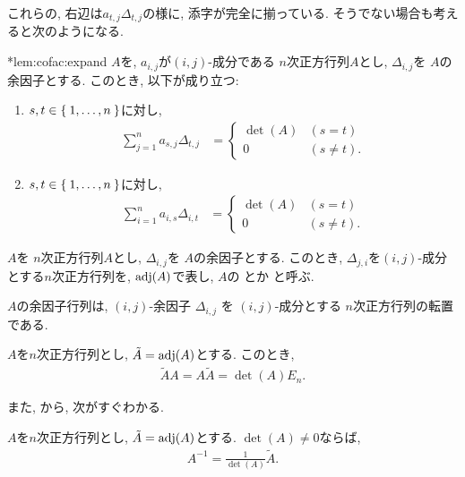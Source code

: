 これらの, 右辺は$a_{t,j}\Delta_{t,j}$の様に, 添字が完全に揃っている.
そうでない場合も考えると次のようになる.
\begin{lemma}
  \provelater**{lem:cofac:expand}
  \label{lem:cofac:expand}
  $A$を,
  $a_{i,j}$が$(i,j)$-成分である
  $n$次正方行列$A$とし,
  $\Delta_{i,j}$を
  $A$の余因子とする.
  このとき, 以下が成り立つ:
  \begin{enumerate}
  \item
  \label{lem:cofac:expand:item:row}    
    $s,t\in\Set{1,\ldots,n}$に対し,
    \begin{align*}
      \sum_{j=1}^{n} a_{s,j}\Delta_{t,j}
      &=
      \begin{cases}
        \det(A) & (s=t)\\
        0 & (s\neq t).
      \end{cases}
    \end{align*}
  \item
    \label{lem:cofac:expand:item:col}    
    $s,t\in\Set{1,\ldots,n}$に対し,
    \begin{align*}
      \sum_{i=1}^{n} a_{i,s}\Delta_{i,t}
      &=
      \begin{cases}
        \det(A) & (s=t)\\
        0 & (s\neq t).
      \end{cases}
    \end{align*}
  \end{enumerate}
\end{lemma}



\begin{definition}
  $A$を
  $n$次正方行列$A$とし,
  $\Delta_{i,j}$を
  $A$の余因子とする.
  このとき,
  $\Delta_{j,i}$を$(i,j)$-成分とする$n$次正方行列を,
  $\operatorname{adj}(A)$で表し,
  $A$の
  とか
  と呼ぶ.
\end{definition}
\begin{remark}
  $A$の余因子行列は,
  $(i,j)$-余因子
  $\Delta_{i,j}$
  を
  $(i,j)$-成分とする
  $n$次正方行列の転置である.
\end{remark}
\begin{prop}
  \label{lem:adj:prod}
  $A$を$n$次正方行列とし,
  $\tilde A = \operatorname{adj}(A)$とする.
  このとき,
  \begin{align*}
    \tilde A A = A \tilde A =\det(A)E_n.
  \end{align*}
\end{prop}
また,
から,
次がすぐわかる.
\begin{prop}
  $A$を$n$次正方行列とし,
  $\tilde A = \operatorname{adj}(A)$とする.
  $\det(A)\neq 0$ならば,
  \begin{align*}
    A^{-1}=\frac{1}{\det(A)}\tilde A.
  \end{align*}
\end{prop}

